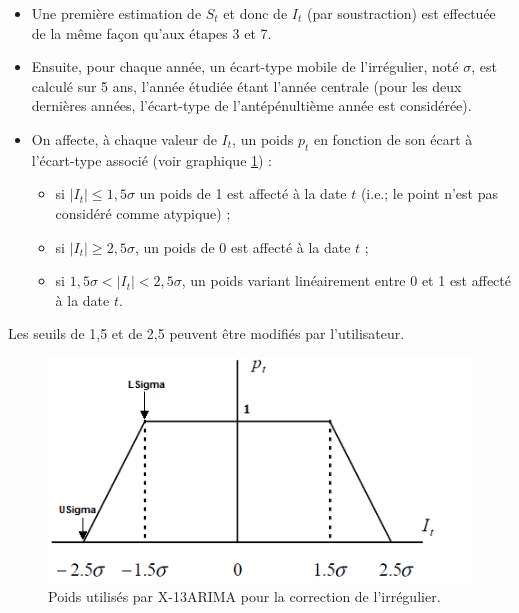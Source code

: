 \documentclass[
  11pt,
  french,
  a4paper]{article}
\newcommand\1{\mathds{1}}
\begin{document}
\begin{itemize}
\item
  Une première estimation de \(S_t\) et donc de \(I_t\) (par soustraction) est effectuée de la même façon qu'aux étapes 3 et 7.
\item
  Ensuite, pour chaque année, un écart-type mobile de l'irrégulier, noté \(\sigma\), est calculé sur 5 ans, l'année étudiée étant l'année centrale (pour les deux dernières années, l'écart-type de l'antépénultième année est considérée).
\item
  On affecte, à chaque valeur de \(I_t\), un poids \(p_t\) en fonction de son écart à l'écart-type associé (voir graphique \ref{fig:correctionautox11}) :

  \begin{itemize}
  \item
    si \(\lvert I_t\rvert\leq 1,5 \sigma\) un poids de 1 est affecté à la date \(t\) (i.e.; le point n'est pas considéré comme atypique) ;
  \item
    si \(\lvert I_t\rvert\geq 2,5 \sigma\), un poids de 0 est affecté à la date \(t\) ;
  \item
    si \(1,5 \sigma<\lvert I_t\rvert< 2,5 \sigma\), un poids variant linéairement entre 0 et 1 est affecté à la date \(t\).
  \end{itemize}
\end{itemize}

Les seuils de 1,5 et de 2,5 peuvent être modifiés par l'utilisateur.

\begin{figure}

{\centering \includegraphics[width=1\linewidth]{img/correction_auto_X11} 

}

\caption[Poids utilisés par X-13ARIMA pour la correction de l'irrégulier]{Poids utilisés par X-13ARIMA pour la correction de l'irrégulier.}\label{fig:correctionautox11}

\footnotesize
\normalsize\end{figure}
\end{document}
